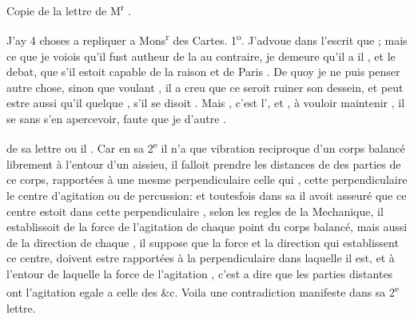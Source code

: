 \documentclass[11pt,a4paper]{article}
\begin{document}
Copie de la lettre de M\textsuperscript{r} .

J'ay 4 choses a repliquer a Mons\textsuperscript{r} des Cartes. 1\textsuperscript{o}. J'advoue   dans l'escrit que \ill{} \ill{}; mais  \ill{} \ill{} ce que je voiois qu'il fust autheur de la  au contraire, je demeure \ill{}  qu'il \ill{} \ill{} a  il \ill{} , et le debat, que s'il estoit capable de la raison et \ill{} \ill{} de Paris \ill{} \ill{}. De quoy je ne puis penser autre chose, sinon que voulant  , il a creu que ce seroit ruiner son dessein, et peut estre aussi qu'il  quelque \ill{} \ill{}, s'il se disoit . Mais \ill{} \ill{} \ill{}, c'est \ill{} \ill{} l', et  \ill{} \ill{},  à vouloir maintenir \ill{}, il se \ill{} sans s'en apercevoir, faute que je  d'autre \ill{}.

\ill{} \ill{} de sa lettre ou il  \ill{} \ill{}. Car en sa 2\textsuperscript{e} il n'a que \ill{} \ill{} \ill{} vibration reciproque d'un corps balancé librement à l'entour d'un aissieu, il falloit prendre les distances de \ill{} des parties de ce corps, rapportées à une mesme perpendiculaire \ill{} celle qui \ill{},  cette perpendiculaire le centre d'agitation ou de percussion: et toutesfois dans sa  il avoit asseuré que ce centre estoit dans cette perpendiculaire \ill{},  selon les regles de la Mechanique, il establissoit \ill{} \ill{} de la force de l'agitation de chaque point du corps balancé, mais aussi de la direction \ill{} de chaque , il suppose que la force et la direction \ill{} qui establissent ce centre, doivent estre rapportées à la perpendiculaire dans laquelle il est, et à l'entour de laquelle \ill{} la force de l'agitation \ill{} \ill{}, c'est a dire que les parties distantes ont l'agitation egale a celle des \ill{} \&c. Voila une contradiction manifeste dans sa 2\textsuperscript{e} lettre.
\end{document}
